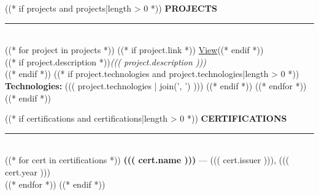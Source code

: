 \documentclass[11pt,a4paper]{article}
\begin{document}
\begin{minipage}[t]{0.60\textwidth}
\begin{minipage}[t]{0.90\textwidth}
((* if projects and projects|length > 0 *))
{\fontsize{11}{13}\selectfont\bfseries\color{navy}\MakeUppercase{Projects}}\\[2pt]
{\color{navy!30}\rule{\linewidth}{0.4pt}}\\[6pt]
((* for project in projects *))
((* if project.link *)) \hfill {\scriptsize\href{((* if 'http' not in project.link *))https://((* endif *))((( project.link )))}{View}}((* endif *))\\
((* if project.description *)){\small\textit{((( project.description )))}}\\((* endif *))
((* if project.technologies and project.technologies|length > 0 *))
{\small\textbf{Technologies:} ((( project.technologies | join(', ') )))}
((* endif *))
\vspace{6pt}
((* endfor *))
((* endif *))

((* if certifications and certifications|length > 0 *))
{\fontsize{11}{13}\selectfont\bfseries\color{navy}\MakeUppercase{Certifications}}\\[2pt]
{\color{navy!30}\rule{\linewidth}{0.4pt}}\\[6pt]
((* for cert in certifications *))
{\small\bfseries ((( cert.name )))} --- {\small\color{muted} ((( cert.issuer ))), ((( cert.year )))}\\[6pt]
((* endfor *))
((* endif *))

\end{minipage}
\end{minipage}
\end{document}
